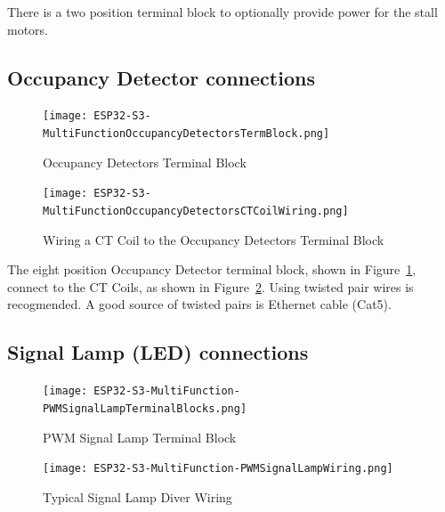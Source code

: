 There is a two position terminal block to optionally provide power for the
stall motors.

\subsection{Occupancy Detector connections}
\begin{figure}[hbpt]\begin{centering}%
\texttt{[image: ESP32-S3-MultiFunctionOccupancyDetectorsTermBlock.png]}
\caption{Occupancy Detectors Terminal Block}
\label{fig:ESP32-S3-MultiFunctionOccupancyDetectorsTermBlock}
\end{centering}\end{figure} 
\begin{figure}[hbpt]\begin{centering}%
\texttt{[image: ESP32-S3-MultiFunctionOccupancyDetectorsCTCoilWiring.png]}
\label{fig:ESP32-S3-MultiFunctionOccupancyDetectorsCTCoilWiring}
\caption{Wiring a CT Coil to the Occupancy Detectors Terminal Block}
\end{centering}\end{figure}

The eight position Occupancy Detector terminal block, shown in 
Figure~\ref{fig:ESP32-S3-MultiFunctionOccupancyDetectorsTermBlock}, connect to 
the CT Coils, as shown in 
Figure~\ref{fig:ESP32-S3-MultiFunctionOccupancyDetectorsCTCoilWiring}.  Using 
twisted pair wires is recogmended.  A good source of twisted pairs is Ethernet 
cable (Cat5).



\subsection{Signal Lamp (LED) connections}
\begin{figure}[hbpt]\begin{centering}%
\texttt{[image: ESP32-S3-MultiFunction-PWMSignalLampTerminalBlocks.png]}
\caption{PWM Signal Lamp Terminal Block}
\label{fig:ESP32-S3-MultiFunction-PWMSignalLampTerminalBlocks}
\end{centering}\end{figure}
\begin{figure}[hbpt]\begin{centering}%
\texttt{[image: ESP32-S3-MultiFunction-PWMSignalLampWiring.png]}
\caption{Typical Signal Lamp Diver Wiring}
\label{fig:ESP32-S3-MultiFunction-PWMSignalLampWiring}
\end{centering}\end{figure}

